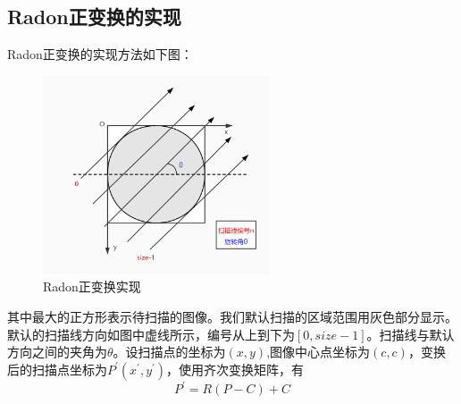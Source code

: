 \documentclass[UTF8]{ctexart}
\begin{document}
\subsection{Radon正变换的实现}
Radon正变换的实现方法如下图：
\begin{figure}[H]
    \centering
    \includegraphics[width=0.6\textwidth]{../image/radon.jpg}
    \caption{Radon正变换实现}
    \label{fig Radon}
\end{figure}
其中最大的正方形表示待扫描的图像。我们默认扫描的区域范围用灰色部分显示。默认的扫描线方向如图中虚线所示，编号从上到下为$[0,size-1]$。扫描线与默认方向之间的夹角为$\theta$。设扫描点的坐标为$(x,y)$,图像中心点坐标为$(c,c)$，变换后的扫描点坐标为$P^\prime(x^\prime,y^\prime)$，使用齐次变换矩阵，有
\begin{equation}
    P^\prime=R(P-C)+C
\end{equation}
\end{document}
